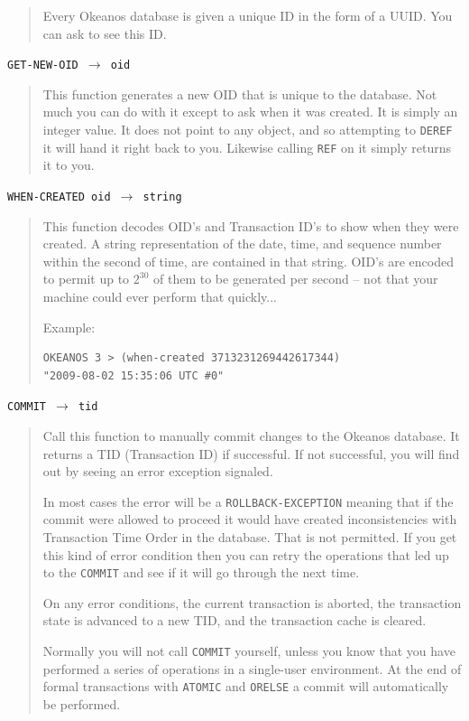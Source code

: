 \documentclass[article,oneside]{memoir}
\begin{document}
\begin{quote}

Every Okeanos database is given a unique ID in the form of a UUID. You can ask to see this ID.
\end{quote}

\noindent \texttt{GET-NEW-OID $\rightarrow$ oid}

\begin{quote}

This function generates a new OID that is unique to the database. Not much you can do with it except to ask when it was created. It is simply an integer value. It does not point to any object, and so attempting to \texttt{DEREF} it will hand it right back to you. Likewise calling \texttt{REF} on it simply returns it to you.
\end{quote}

\noindent \texttt{WHEN-CREATED oid $\rightarrow$ string}

\begin{quote}

This function decodes OID's and Transaction ID's to show when they were created. A string representation of the date, time, and sequence number within the second of time, are contained in that string. OID's are encoded to permit up to $2^{30}$ of them to be generated per second -- not that your machine could ever perform that quickly...

Example:
\begin{verbatim}
OKEANOS 3 > (when-created 3713231269442617344)
"2009-08-02 15:35:06 UTC #0"
\end{verbatim}
\end{quote}

\noindent \texttt{COMMIT $\rightarrow$ tid}

\begin{quote}

Call this function to manually commit changes to the Okeanos database. It returns a TID (Transaction ID) if successful. If not successful, you will find out by seeing an error exception signaled. 

In most cases the error will be a \texttt{ROLLBACK-EXCEPTION} meaning that if the commit were allowed to proceed it would have created inconsistencies with Transaction Time Order in the database. That is not permitted. If you get this kind of error condition then you can retry the operations that led up to the \texttt{COMMIT} and see if it will go through the next time.

On any error conditions, the current transaction is aborted, the transaction state is advanced to a new TID, and the transaction cache is cleared. 

Normally you will not call \texttt{COMMIT} yourself, unless you know that you have performed a series of operations in a single-user environment. At the end of formal transactions with \texttt{ATOMIC} and \texttt{ORELSE} a commit will automatically be performed.
\end{quote}
\end{document}
